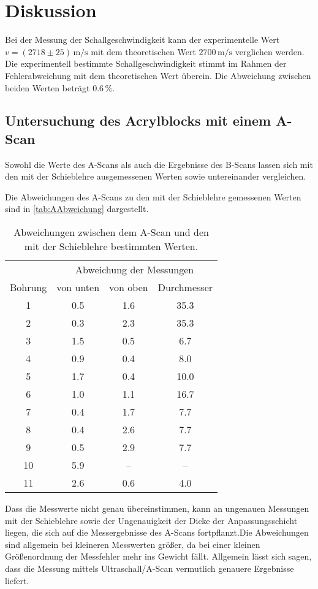 \section{Diskussion}
\label{sec:Diskussion}

Bei der Messung der Schallgeschwindigkeit kann der experimentelle Wert $v = (2718\pm 25) \, \unit{\m\per\s}$ mit dem theoretischen Wert 
$2700 \,\unit{\m\per\s}$ verglichen werden. Die experimentell bestimmte Schallgeschwindigkeit stimmt im Rahmen der Fehlerabweichung mit 
dem theoretischen Wert überein. Die Abweichung zwischen beiden Werten beträgt $0.6\,\%$. 

\subsection{Untersuchung des Acrylblocks mit einem A-Scan}
Sowohl die Werte des A-Scans als auch die Ergebnisse des B-Scans lassen sich mit den mit der Schieblehre ausgemessenen Werten sowie untereinander 
vergleichen.

Die Abweichungen des A-Scans zu den mit der Schieblehre gemessenen Werten sind in \autoref{tab:AAbweichung} dargestellt. 

\begin{table}
    \centering 
    \caption{Abweichungen zwischen dem A-Scan und den mit der Schieblehre bestimmten Werten.}
\begin{tabular}{c c c c}
    \toprule
    & \multicolumn{3}{c}{Abweichung der Messungen} \\
    Bohrung & von unten & von oben & Durchmesser\\
    \midrule
    1&0.5&1.6&35.3 \\
    2&0.3&2.3&35.3 \\
     3&1.5&0.5&6.7 \\
     4&0.9&0.4&8.0 \\
    5&1.7&0.4&10.0 \\
    6&1.0&1.1&16.7 \\
     7&0.4&1.7&7.7 \\
     8&0.4&2.6&7.7 \\
     9&0.5&2.9&7.7 \\
    10&5.9&--&-- \\
    11&2.6&0.6&4.0 \\
    \bottomrule
\end{tabular}
\label{tab:AAbweichung}
\end{table}
Dass die Messwerte nicht genau übereinstimmen, kann an ungenauen Messungen mit der Schieblehre sowie der Ungenauigkeit der Dicke der Anpassungsschicht 
liegen, die sich auf die Messergebnisse des A-Scans fortpflanzt.Die Abweichungen sind allgemein bei kleineren Messwerten größer, da bei einer kleinen 
Größenordnung der Messfehler mehr ins Gewicht fällt. Allgemein lässt sich sagen, dass die Messung mittels Ultraschall/A-Scan vermutlich genauere Ergebnisse 
liefert.